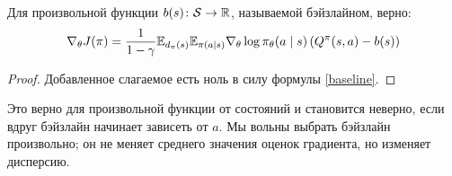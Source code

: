 \begin{proposition}
Для произвольной функции $b(s) \colon \mathcal{S} \to \mathbb{R}$, называемой бэйзлайном, верно:
\begin{equation}\label{pgt_baseline}
\nabla_{\theta} J(\pi) = \frac{1}{1 - \gamma}\mathbb{E}_{d_\pi(s)} \mathbb{E}_{\pi(a \mid s)} \nabla_{\theta} \log \pi_\theta (a \mid s) \left(Q^{\pi}(s, a) - b(s) \right)
\end{equation}
\begin{proof}
Добавленное слагаемое есть ноль в силу формулы \eqref{baseline}. 
\end{proof}
\end{proposition}

Это верно для произвольной функции от состояний и становится неверно, если вдруг бэйзлайн начинает зависеть от $a$. Мы вольны выбрать бэйзлайн произвольно; он не меняет среднего значения оценок градиента, но изменяет дисперсию. 


